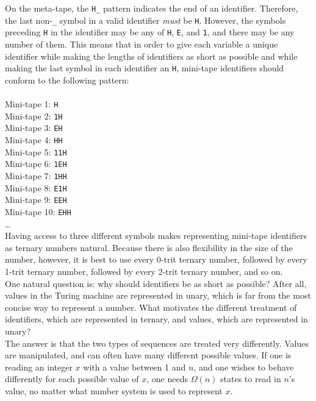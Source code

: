 \documentclass[11pt]{report}
\begin{document}
On the meta-tape, the \texttt{H\_} pattern indicates the end of an identifier. Therefore, the last non-\texttt{\_} symbol in a valid identifier \emph{must} be \texttt{H}. However, the symbols preceding \texttt{H} in the identifier may be any of \texttt{H}, \texttt{E}, and \texttt{1}, and there may be any number of them. This means that in order to give each variable a unique identifier while making the lengths of identifiers as short as possible and while making the last symbol in each identifier an \texttt{H}, mini-tape identifiers should conform to the following pattern: \\ \\
Mini-tape 1: \texttt{H} \\
Mini-tape 2: \texttt{1H} \\
Mini-tape 3: \texttt{EH} \\
Mini-tape 4: \texttt{HH} \\
Mini-tape 5: \texttt{11H} \\
Mini-tape 6: \texttt{1EH} \\
Mini-tape 7: \texttt{1HH} \\
Mini-tape 8: \texttt{E1H} \\
Mini-tape 9: \texttt{EEH} \\
Mini-tape 10: \texttt{EHH} \\
\dots \\

Having access to three different symbols makes representing mini-tape identifiers as ternary numbers natural. Because there is also flexibility in the size of the number, however, it is best to use every 0-trit ternary number, followed by every 1-trit ternary number, followed by every 2-trit ternary number, and so on. \\

One natural question is: why should identifiers be as short as possible? After all, values in the Turing machine are represented in unary, which is far from the most concise way to represent a number. What motivates the different treatment of identifiers, which are represented in ternary, and values, which are represented in unary? \\

The answer is that the two types of sequences are treated very differently. Values are manipulated, and can often have many different possible values. If one is reading an integer $x$ with a value between 1 and $n$, and one wishes to behave differently for each possible value of $x$, one needs $\Omega(n)$ states to read in $n$'s value, no matter what number system is used to represent $x$. \\
\end{document}
